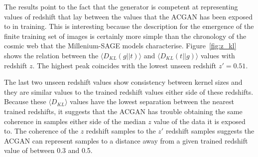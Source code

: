 \documentclass[twocolumn]{article}
\numberwithin{equation}{section}
\begin{document}
    
               

The results point to the fact that the generator is competent at representing values of redshift that lay between the
values that the ACGAN has been exposed to in training. This is interesting because the description for the emergence
of the finite training set of images is certainly more simple than the chronology of the cosmic web that the Millenium-SAGE
models characterise. Figure~\ref{fig:z_kl} shows the relation between the $\langle D_{KL}(g||t) \rangle$ and 
$\langle D_{KL}(t||g) \rangle$ values with redshift $z$. The highest peak coincides with the lowest unseen redshift $z'=0.51$.

The last two unseen redshift values show consistency between kernel sizes and they are similar values to the trained redshift 
values either side of these redshifts. Because these $\langle D_{KL} \rangle$ values have the lowest separation between the 
nearest trained redshifts, it suggests that the ACGAN has trouble obtaining the same coherence in samples either side of the 
median $z$ value of the data it is exposed to. The coherence of the $z$ redshift samples to the $z'$ redshift samples suggests
the ACGAN can represent samples to a distance away from a given trained redshift value of between 0.3 and 0.5.
\end{document}
